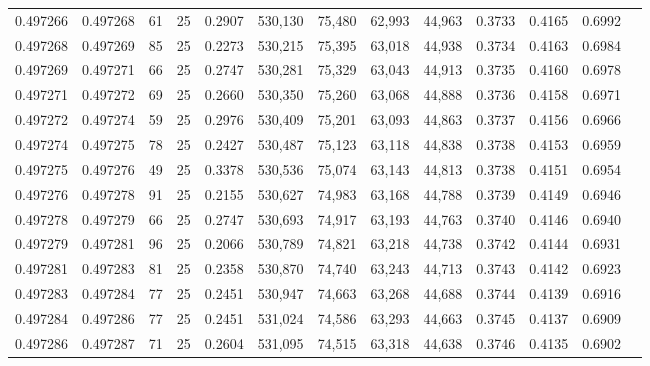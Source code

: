 \begin{tabular}{rrrrrrrrrrrrr}
0.497266 & 0.497268 &    61 &  25 &                                     0.2907 & 530,130 &  75,480 &  62,993 &  44,963 & 0.3733 & 0.4165 & 0.6992 \\
0.497268 & 0.497269 &    85 &  25 &                                     0.2273 & 530,215 &  75,395 &  63,018 &  44,938 & 0.3734 & 0.4163 & 0.6984 \\
0.497269 & 0.497271 &    66 &  25 &                                     0.2747 & 530,281 &  75,329 &  63,043 &  44,913 & 0.3735 & 0.4160 & 0.6978 \\
0.497271 & 0.497272 &    69 &  25 &                                     0.2660 & 530,350 &  75,260 &  63,068 &  44,888 & 0.3736 & 0.4158 & 0.6971 \\
0.497272 & 0.497274 &    59 &  25 &                                     0.2976 & 530,409 &  75,201 &  63,093 &  44,863 & 0.3737 & 0.4156 & 0.6966 \\
0.497274 & 0.497275 &    78 &  25 &                                     0.2427 & 530,487 &  75,123 &  63,118 &  44,838 & 0.3738 & 0.4153 & 0.6959 \\
0.497275 & 0.497276 &    49 &  25 &                                     0.3378 & 530,536 &  75,074 &  63,143 &  44,813 & 0.3738 & 0.4151 & 0.6954 \\
0.497276 & 0.497278 &    91 &  25 &                                     0.2155 & 530,627 &  74,983 &  63,168 &  44,788 & 0.3739 & 0.4149 & 0.6946 \\
0.497278 & 0.497279 &    66 &  25 &                                     0.2747 & 530,693 &  74,917 &  63,193 &  44,763 & 0.3740 & 0.4146 & 0.6940 \\
0.497279 & 0.497281 &    96 &  25 &                                     0.2066 & 530,789 &  74,821 &  63,218 &  44,738 & 0.3742 & 0.4144 & 0.6931 \\
0.497281 & 0.497283 &    81 &  25 &                                     0.2358 & 530,870 &  74,740 &  63,243 &  44,713 & 0.3743 & 0.4142 & 0.6923 \\
0.497283 & 0.497284 &    77 &  25 &                                     0.2451 & 530,947 &  74,663 &  63,268 &  44,688 & 0.3744 & 0.4139 & 0.6916 \\
0.497284 & 0.497286 &    77 &  25 &                                     0.2451 & 531,024 &  74,586 &  63,293 &  44,663 & 0.3745 & 0.4137 & 0.6909 \\
0.497286 & 0.497287 &    71 &  25 &                                     0.2604 & 531,095 &  74,515 &  63,318 &  44,638 & 0.3746 & 0.4135 & 0.6902 \\

\end{tabular}
